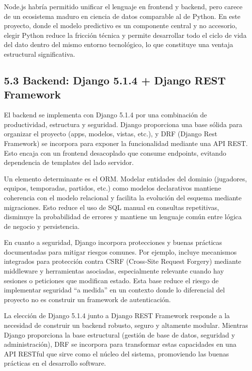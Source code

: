 Node.js habría permitido unificar el lenguaje en frontend y backend, pero carece de un ecosistema 
maduro en ciencia de datos comparable al de Python. En este proyecto, donde el modelo predictivo es 
un componente central y no accesorio, elegir Python reduce la fricción técnica y permite desarrollar 
todo el ciclo de vida del dato dentro del mismo entorno tecnológico, lo que constituye una ventaja 
estructural significativa.

\subsection{5.3 Backend: Django 5.1.4 + Django REST Framework}

El backend se implementa con Django 5.1.4 por una combinación de productividad, estructura y 
seguridad. Django proporciona una base sólida para organizar el proyecto (apps, modelos, vistas, 
etc.), y DRF (Django Rest Framework) se incorpora para exponer la funcionalidad mediante una API 
REST. Esto encaja con un frontend desacoplado que consume endpoints, evitando dependencia 
de templates del lado servidor.

Un elemento determinante es el ORM. Modelar entidades del dominio (jugadores, equipos, temporadas, 
partidos, etc.) como modelos declarativos mantiene coherencia con el modelo relacional y facilita 
la evolución del esquema mediante migraciones. Esto reduce el uso de SQL manual en consultas 
repetitivas, disminuye la probabilidad de errores y mantiene un lenguaje común entre lógica de 
negocio y persistencia.

En cuanto a seguridad, Django incorpora protecciones y buenas prácticas documentadas para mitigar riesgos 
comunes. Por ejemplo, incluye mecanismos integrados para protección contra CSRF (Cross‑Site Request 
Forgery) mediante middleware y herramientas asociadas, especialmente relevante cuando hay sesiones 
o peticiones que modifican estado. Esta base reduce el riesgo de implementar seguridad ``a medida'' 
en un contexto donde lo diferencial del proyecto no es construir un framework de autenticación.

La elección de Django 5.1.4 junto a Django REST Framework responde a la necesidad de construir un 
backend robusto, seguro y altamente modular. Mientras Django proporciona la base estructural (gestión 
de base de datos, seguridad y administración), DRF se incorpora para transformar estas capacidades 
en una API RESTful que sirve como el núcleo del sistema, promoviendo las buenas prácticas en el 
desarrollo software.

